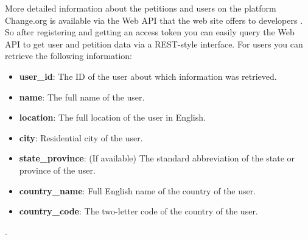 More detailed information about the petitions and users on the platform Change.org is available via the Web API that the web site offers to developers \citep{Change14c}. So after registering and getting an access token you can easily query the Web API to get user and petition data via a REST-style interface. For users you can retrieve the following information: 
\begin{itemize}
\item \textbf{user\_id}: The ID of the user about which information was retrieved.
\item \textbf{name}: The full name of the user.
\item \textbf{location}: The full location of the user in English.
\item \textbf{city}: Residential city of the user.
\item \textbf{state\_province}: (If available) The standard abbreviation of the state or province of the user.
\item \textbf{country\_name}: Full English name of the country of the user.
\item \textbf{country\_code}: The two-letter code of the country of the user.
\end{itemize}

\citep{Github14a}.\par \vspace{0.2cm}

